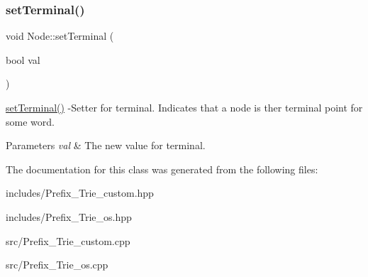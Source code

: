 \subsubsection{\texorpdfstring{set\+Terminal()}{setTerminal()}}
{\footnotesize\ttfamily void Node\+::set\+Terminal (\begin{DoxyParamCaption}\item[{bool}]{val }\end{DoxyParamCaption})}

\hyperlink{class_node_a6b9cb87985f29025ad3a2905f61e94c3}{set\+Terminal()} -\/\+Setter for terminal. Indicates that a node is ther terminal point for some word. 
\begin{DoxyParams}{Parameters}
{\em val} & The new value for terminal. \\
\hline
\end{DoxyParams}


The documentation for this class was generated from the following files\+:\begin{DoxyCompactItemize}
\item 
includes/Prefix\+\_\+\+Trie\+\_\+custom.\+hpp\item 
includes/Prefix\+\_\+\+Trie\+\_\+os.\+hpp\item 
src/Prefix\+\_\+\+Trie\+\_\+custom.\+cpp\item 
src/Prefix\+\_\+\+Trie\+\_\+os.\+cpp\end{DoxyCompactItemize}
